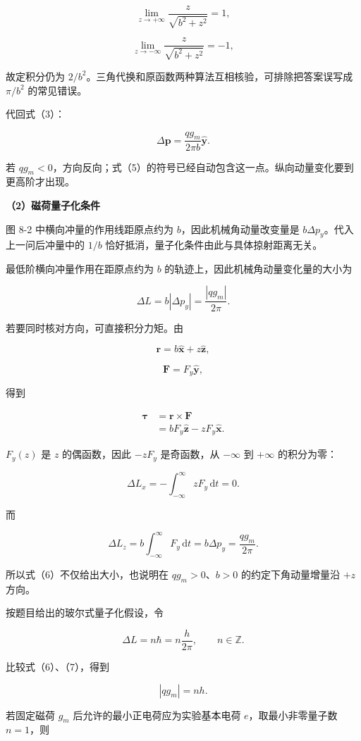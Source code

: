 \documentclass[12pt,a4paper,UTF8]{ctexart}
\begin{document}
\[\lim_{z\to+\infty}\frac{z}{\sqrt{b^2+z^2}}=1,\]

\[\lim_{z\to-\infty}\frac{z}{\sqrt{b^2+z^2}}=-1,\]

故定积分仍为
\(2/b^2\)。三角代换和原函数两种算法互相核验，可排除把答案误写成
\(\pi/b^2\) 的常见错误。

代回式（3）：

\[\boxed{
\Delta\boldsymbol p
=\frac{qg_m}{2\pi b}\hat{\boldsymbol y}
}. \tag{5}\]

若
\(qg_m<0\)，方向反向；式（5）的符号已经自动包含这一点。纵向动量变化要到更高阶才出现。

\textbf{（2）磁荷量子化条件}

图 8-2 中横向冲量的作用线距原点约为 \(b\)，因此机械角动量改变量是
\(b\Delta p_y\)。代入上一问后冲量中的 \(1/b\)
恰好抵消，量子化条件由此与具体掠射距离无关。

最低阶横向冲量作用在距原点约为 \(b\)
的轨迹上，因此机械角动量变化量的大小为

\[\Delta L=b|\Delta p_y|
=\frac{|qg_m|}{2\pi}. \tag{6}\]

若要同时核对方向，可直接积分力矩。由

\[\boldsymbol r=b\hat{\boldsymbol x}+z\hat{\boldsymbol z},\]

\[\boldsymbol F=F_y\hat{\boldsymbol y},\]

得到

\[\begin{aligned}
\boldsymbol\tau
&=\boldsymbol r\times\boldsymbol F\\
&=bF_y\hat{\boldsymbol z}-zF_y\hat{\boldsymbol x}.
\end{aligned}\]

\(F_y(z)\) 是 \(z\) 的偶函数，因此 \(-zF_y\) 是奇函数，从 \(-\infty\) 到
\(+\infty\) 的积分为零：

\[\Delta L_x=-\int_{-\infty}^{\infty}zF_y\,\mathrm dt=0.\]

而

\[\Delta L_z=b\int_{-\infty}^{\infty}F_y\,\mathrm dt
=b\Delta p_y
=\frac{qg_m}{2\pi}.\]

所以式（6）不仅给出大小，也说明在 \(qg_m>0\)、\(b>0\)
的约定下角动量增量沿 \(+z\) 方向。

按题目给出的玻尔式量子化假设，令

\[\Delta L=n\hbar=n\frac{h}{2\pi},\qquad n\in\mathbb Z. \tag{7}\]

比较式（6）、（7），得到

\[|qg_m|=nh. \tag{8}\]

若固定磁荷 \(g_m\) 后允许的最小正电荷应为实验基本电荷
\(e\)，取最小非零量子数 \(n=1\)，则
\end{document}
